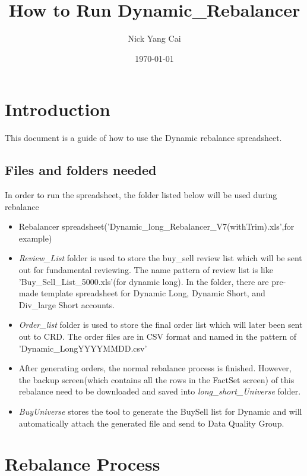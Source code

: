\documentclass[12pt,letterpaper,twoside]{article}
\begin{document}
\title{How to Run Dynamic\_Rebalancer}
 \author{Nick Yang Cai}
\date{\today}
\maketitle
\medskip
\medskip
\medskip
\tableofcontents  %

\newpage

\section{Introduction}
This document is a guide of how to use the Dynamic rebalance spreadsheet.
\subsection{Files and folders needed}
In order to run the spreadsheet, the folder listed below will be used during rebalance
\begin{itemize}
  \item Rebalancer spreadsheet('Dynamic\_long\_Rebalancer\_V7(withTrim).xls',for example)
  \item \emph{Review\_List} folder is used to store the buy\_sell review list which will be sent out for fundamental reviewing. The name pattern of review list is like 'Buy\_Sell\_List\_5000.xls'(for dynamic long). In the folder, there are pre-made template spreadsheet for Dynamic Long, Dynamic Short, and Div\_large Short accounts.
  \item \emph{Order\_list} folder is used to store the final order list which will later been sent out to CRD. The order files are in CSV format and named in the pattern of 'Dynamic\_LongYYYYMMDD.csv'
  \item After generating orders, the normal rebalance process is finished. However, the backup screen(which contains all the rows in the FactSet screen) of this rebalance need to be downloaded and saved into \emph{long\_short\_Universe} folder.
  \item \emph{BuyUniverse} stores the tool to generate the BuySell list for Dynamic and will automatically attach the generated file and send to Data Quality Group.
\end{itemize}
\section{Rebalance Process}
\end{document}
